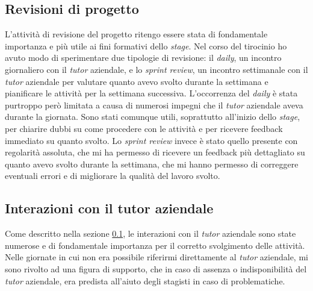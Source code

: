 \subsection{Revisioni di progetto} \label{sec:revisioni}
L'attività di revisione del progetto ritengo essere stata di fondamentale importanza e più utile ai fini formativi dello \textit{stage}.
Nel corso del tirocinio ho avuto modo di sperimentare due tipologie di revisione: il \textit{daily}, un incontro giornaliero con il \textit{tutor} aziendale, e lo \textit{sprint review}, un incontro settimanale con il \textit{tutor} aziendale per valutare quanto avevo svolto durante la settimana e pianificare le attività per la settimana successiva.
L'occorrenza del \textit{daily} è stata purtroppo però limitata a causa di numerosi impegni che il \textit{tutor} aziendale aveva durante la giornata. Sono stati comunque utili, soprattutto all'inizio dello \textit{stage}, per chiarire dubbi su come procedere con le attività e per ricevere feedback immediato su quanto svolto.
Lo \textit{sprint review} invece è stato quello presente con regolarità assoluta, che mi ha permesso di ricevere un feedback più dettagliato su quanto avevo svolto durante la settimana, che mi hanno permesso di correggere eventuali errori e di migliorare la qualità del lavoro svolto.

\subsection{Interazioni con il tutor aziendale}
Come descritto nella sezione \ref{sec:revisioni}, le interazioni con il \textit{tutor} aziendale sono state numerose e di fondamentale importanza per il corretto svolgimento delle attività.
Nelle giornate in cui non era possibile riferirmi direttamente al \textit{tutor} aziendale, mi sono rivolto ad una figura di supporto, che in caso di assenza o indisponibilità del \textit{tutor} aziendale, era predista all'aiuto degli stagisti in caso di problematiche.

